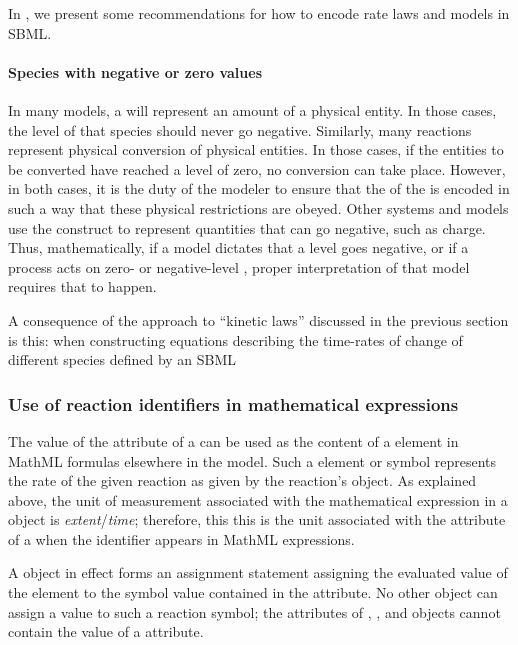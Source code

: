 In , we present some recommendations for
how to encode rate laws and models in SBML.

\paragraph{Species with negative or zero values}
\label{sec:neg-species}
In many models, a \Species will represent an amount of a physical entity.  In those cases, the level of that species should never go negative.  Similarly, many reactions represent physical conversion of physical entities.  In those cases, if the entities to be converted have reached a level of zero, no conversion can take place.  However, in both cases, it is the duty of the modeler to ensure that the \KineticLaw of the \Reaction is encoded in such a way that these physical restrictions are obeyed.  Other systems and models use the \Species construct to represent quantities that can go negative, such as charge.  Thus, mathematically, if a model dictates that a \Species level goes negative, or if a \Reaction process acts on zero- or negative-level \Species, proper interpretation of that model requires that to happen.

A consequence of the approach to ``kinetic laws'' discussed in the
previous section is this: when constructing equations describing
the time-rates of change of different species defined by an SBML


\subsubsection{Use of reaction identifiers in mathematical expressions}
\label{subsec:reaction-as-symbol}

The value of the  attribute of a \Reaction can be used
as the content of a  element in MathML formulas
elsewhere in the model.  Such a  element or symbol
represents the rate of the given reaction as given by the
reaction's \KineticLaw object.  As explained above, the unit of
measurement associated with the mathematical expression in a
\KineticLaw object is \emph{extent}/\emph{time}; therefore, this
this is the unit associated with the  attribute of a
\Reaction when the identifier appears in MathML expressions.

A \KineticLaw object in effect forms an assignment statement
assigning the evaluated value of the  element to the
symbol value contained in the \Reaction {} attribute.  No
other object can assign a value to such a reaction symbol; \ie the
  attributes of \InitialAssignment, \RateRule,
\AssignmentRule and \EventAssignment objects cannot contain the
value of a \Reaction {} attribute.

